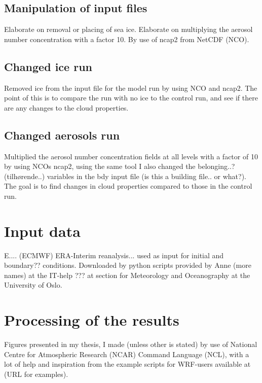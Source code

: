 \subsection{Manipulation of input files}
Elaborate on removal or placing of sea ice. Elaborate on multiplying the aerosol number concentration with a factor 10. By use of ncap2 from NetCDF (NCO).
\subsection{Changed ice run}
Removed ice from the input file for the model run by using NCO and ncap2. The point of this is to compare the run with no ice to the control run, and see if there are any changes to the cloud properties.
\subsection{Changed aerosols run}
Multiplied the aerosol number concentration fields at all levels with a factor of 10 by using NCOs ncap2, using the same tool I also changed the belonging..? (tilhørende..) variables in the bdy input file (is this a building file.. or what?). The goal is to find changes in cloud properties compared to those in the control run.

\section{Input data}
E.... (ECMWF) ERA-Interim reanalysis... used as input for initial and boundary?? conditions. Downloaded by python scripts provided by Anne (more names) at the IT-help ??? at section for Meteorology and Oceanography at the University of Oslo.

\section{Processing of the results}
Figures presented in my thesis, I made (unless other is stated) by use of National Centre for Atmospheric Research (NCAR) Command Language (NCL), with a lot of help and inspiration from the example scripts for WRF-users available at (URL for examples).